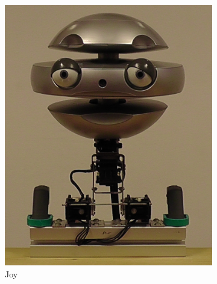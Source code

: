 \begin{figure}[ht]
    \centering
    \begin{subfigure}{0.2\columnwidth}
        \includegraphics[width=\columnwidth]{images/gbe/joy.jpg}
        \caption{Joy}
    \end{subfigure}
    \begin{subfigure}{0.2\columnwidth}

\end{subfigure}
\end{figure}
